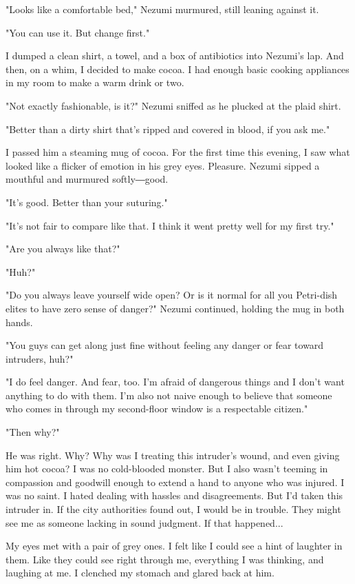 "Looks like a comfortable bed," Nezumi murmured, still leaning against
it.

"You can use it. But change first."

I dumped a clean shirt, a towel, and a box of antibiotics into Nezumi's
lap. And then, on a whim, I decided to make cocoa. I had enough basic
cooking appliances in my room to make a warm drink or two.

"Not exactly fashionable, is it?" Nezumi sniffed as he plucked at the
plaid shirt.

"Better than a dirty shirt that's ripped and covered in blood, if you
ask me."

I passed him a steaming mug of cocoa. For the first time this evening, I
saw what looked like a flicker of emotion in his grey eyes. Pleasure.
Nezumi sipped a mouthful and murmured softly―good.

"It's good. Better than your suturing."

"It's not fair to compare like that. I think it went pretty well for my
first try."

"Are you always like that?"

"Huh?"

"Do you always leave yourself wide open? Or is it normal for all you
Petri-dish elites to have zero sense of danger?" Nezumi continued,
holding the mug in both hands.

"You guys can get along just fine without feeling any danger or fear
toward intruders, huh?"

"I do feel danger. And fear, too. I'm afraid of dangerous things and I
don't want anything to do with them. I'm also not naive enough to
believe that someone who comes in through my second-floor window is a
respectable citizen."

"Then why?"

He was right. Why? Why was I treating this intruder's wound, and even
giving him hot cocoa? I was no cold-blooded monster. But I also wasn't
teeming in compassion and goodwill enough to extend a hand to anyone who
was injured. I was no saint. I hated dealing with hassles and
disagreements. But I'd taken this intruder in. If the city authorities
found out, I would be in trouble. They might see me as someone lacking
in sound judgment. If that happened...

My eyes met with a pair of grey ones. I felt like I could see a hint of
laughter in them. Like they could see right through me, everything I was
thinking, and laughing at me. I clenched my stomach and glared back at
him.

